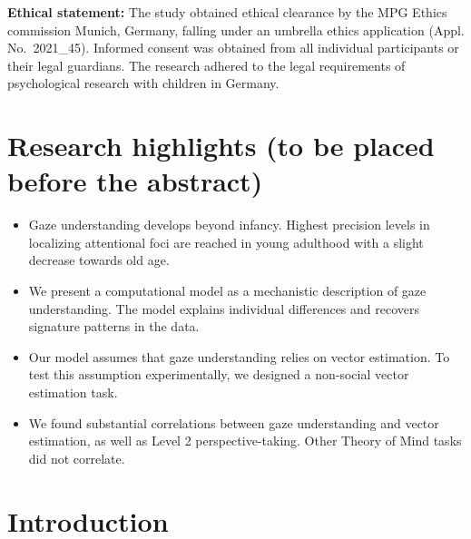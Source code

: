 \documentclass[
  man,mask,floatsintext]{apa7}
\providecommand{\tightlist}{%
  \setlength{\itemsep}{0pt}\setlength{\parskip}{0pt}}
\begin{document}
\textbf{Ethical statement:} The study obtained ethical clearance by the MPG Ethics commission Munich, Germany, falling under an umbrella ethics application (Appl. No.~2021\_45). Informed consent was obtained from all individual participants or their legal guardians. The research adhered to the legal requirements of psychological research with children in Germany.

\newpage

\hypertarget{research-highlights-to-be-placed-before-the-abstract}{%
\section{Research highlights (to be placed before the abstract)}\label{research-highlights-to-be-placed-before-the-abstract}}

\begin{itemize}
\tightlist
\item
  Gaze understanding develops beyond infancy. Highest precision levels in localizing attentional foci are reached in young adulthood with a slight decrease towards old age.
\item
  We present a computational model as a mechanistic description of gaze understanding. The model explains individual differences and recovers signature patterns in the data.
\item
  Our model assumes that gaze understanding relies on vector estimation. To test this assumption experimentally, we designed a non-social vector estimation task.
\item
  We found substantial correlations between gaze understanding and vector estimation, as well as Level 2 perspective-taking. Other Theory of Mind tasks did not correlate.
\end{itemize}

\hypertarget{introduction}{%
\section{Introduction}\label{introduction}}
\end{document}
